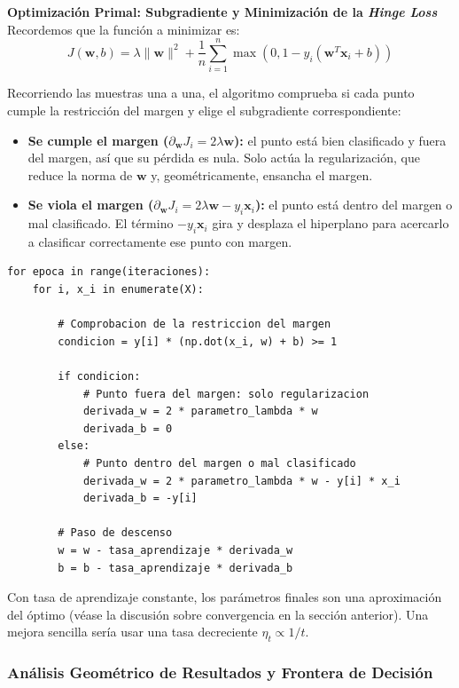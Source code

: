 \documentclass[12pt, a4paper]{article}
\begin{document}
\noindent \textbf{Optimización Primal: Subgradiente y Minimización de la \textit{Hinge Loss}} \\

\noindent Recordemos que la función a minimizar es:
\[ J(\mathbf{w}, b) = \lambda \|\mathbf{w}\|^2 + \frac{1}{n}\sum_{i=1}^{n} \max(0, 1 - y_i(\mathbf{w}^T \mathbf{x}_i + b)) \]

\noindent Recorriendo las muestras una a una, el algoritmo comprueba si cada punto cumple la restricción del margen y elige el subgradiente correspondiente:

\begin{itemize}
    \item \textbf{Se cumple el margen ($\partial_{\mathbf{w}} J_i = 2\lambda\mathbf{w}$):} el punto está bien clasificado y fuera del margen, así que su pérdida es nula. Solo actúa la regularización, que reduce la norma de $\mathbf{w}$ y, geométricamente, ensancha el margen.
    \item \textbf{Se viola el margen ($\partial_{\mathbf{w}} J_i = 2\lambda\mathbf{w} - y_i\mathbf{x}_i$):} el punto está dentro del margen o mal clasificado. El término $-y_i \mathbf{x}_i$ gira y desplaza el hiperplano para acercarlo a clasificar correctamente ese punto con margen.
\end{itemize}

\begin{lstlisting}
for epoca in range(iteraciones):
    for i, x_i in enumerate(X):

        # Comprobacion de la restriccion del margen
        condicion = y[i] * (np.dot(x_i, w) + b) >= 1

        if condicion:
            # Punto fuera del margen: solo regularizacion
            derivada_w = 2 * parametro_lambda * w
            derivada_b = 0
        else:
            # Punto dentro del margen o mal clasificado
            derivada_w = 2 * parametro_lambda * w - y[i] * x_i
            derivada_b = -y[i]

        # Paso de descenso
        w = w - tasa_aprendizaje * derivada_w
        b = b - tasa_aprendizaje * derivada_b
\end{lstlisting}

\noindent Con tasa de aprendizaje constante, los parámetros finales son una aproximación del óptimo (véase la discusión sobre convergencia en la sección anterior). Una mejora sencilla sería usar una tasa decreciente $\eta_t \propto 1/t$.

\subsubsection{Análisis Geométrico de Resultados y Frontera de Decisión}
\end{document}
